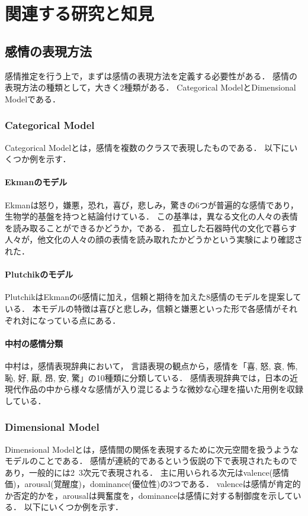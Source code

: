 \chapter{関連する研究と知見}

\section{感情の表現方法}
	感情推定を行う上で，まずは感情の表現方法を定義する必要性がある．
	感情の表現方法の種類として，大きく2種類がある\cite{emotion_analysis_survay}．
	Categorical ModelとDimensional Modelである．

	\subsection{Categorical Model}
		Categorical Modelとは，感情を複数のクラスで表現したものである．
		以下にいくつか例を示す．

		\subsubsection{Ekmanのモデル}
			Ekman\cite{ekman}は怒り，嫌悪，恐れ，喜び，悲しみ，驚きの6つが普遍的な感情であり，生物学的基盤を持つと結論付けている．
			この基準は，異なる文化の人々の表情を読み取ることができるかどうか，である．
			孤立した石器時代の文化で暮らす人々が，他文化の人々の顔の表情を読み取れたかどうかという実験により確認された．

		\subsubsection{Plutchikのモデル}
			Plutchik\cite{plutchik}はEkmanの6感情に加え，信頼と期待を加えた8感情のモデルを提案している．
			本モデルの特徴は喜びと悲しみ，信頼と嫌悪といった形で各感情がそれぞれ対になっている点にある．

		\subsubsection{中村の感情分類}
			中村\cite{kanjou_hyogen_jiten}は，感情表現辞典\cite{kanjou_hyogen_jiten}において，
			言語表現の観点から，感情を「喜, 怒, 哀, 怖, 恥, 好, 厭, 昂, 安, 驚」の10種類に分類している．
			感情表現辞典では，日本の近現代作品の中から様々な感情が入り混じるような微妙な心理を描いた用例を収録している．

	\subsection{Dimensional Model}
		Dimensional Modelとは，感情間の関係を表現するために次元空間を扱うようなモデルのことである．
		感情が連続的であるという仮説の下で表現されたものであり，一般的には2~3次元で表現される．
		主に用いられる次元はvalence(感情価)，arousal(覚醒度)，dominance(優位性)の3つである．
		valenceは感情が肯定的か否定的かを，arousalは興奮度を，dominanceは感情に対する制御度を示している．\cite{emotion_model_1}\cite{emotion_model_2}
		以下にいくつか例を示す．

